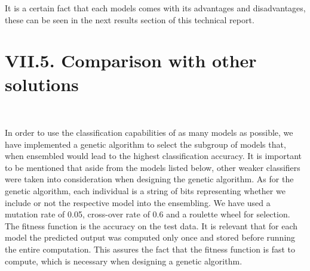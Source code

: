 \documentclass[11pt, a4papper]{report}
\theoremstyle{plain}
\theoremstyle{definition}
\theoremstyle{definition}
\theoremstyle{proposition}
\begin{document}
It is a certain fact that each models comes with its advantages and disadvantages, these can be seen in the next results section of this technical report. 


\section*{VII.5. Comparison with other solutions}
\

In order to use the classification capabilities of as many models as possible, we have implemented a genetic algorithm to select the subgroup of models that, when ensembled would lead to the highest classification accuracy. It is important to be mentioned that aside from the models listed below, other weaker classifiers were taken into consideration when designing the genetic algorithm. As for the genetic algorithm, each individual is a string of bits representing whether we include or not the respective model into the ensembling. We have used a mutation rate of 0.05, cross-over rate of 0.6 and a roulette wheel for selection. The fitness function is the accuracy on the test data. It is relevant that for each model the predicted output was computed only once and stored before running the entire computation. This assures the fact that the fitness function is fast to compute, which is necessary when designing a genetic algorithm.
\\
\end{document}
